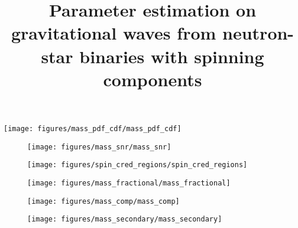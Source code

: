 \documentclass[iop,apj,twocolumn,twocolappendix,numberedappendix]{emulateapj}
\begin{document}
\title{Parameter estimation on gravitational waves from neutron-star binaries with spinning components}















\begin{figure*}
  \centering
  \texttt{[image: figures/mass\_pdf\_cdf/mass\_pdf\_cdf]}
  \caption{\protect} 
\end{figure*}

\begin{figure}
  \centering
  \texttt{[image: figures/mass\_snr/mass\_snr]}
  \caption{\protect} 
\end{figure}



\begin{figure}
  \centering
  \texttt{[image: figures/spin\_cred\_regions/spin\_cred\_regions]}
  \caption{\protect} 
\end{figure}



\begin{figure}
  \centering
  \texttt{[image: figures/mass\_fractional/mass\_fractional]}
  \caption{\protect} 
\end{figure}



\begin{figure}
  \centering
  \texttt{[image: figures/mass\_comp/mass\_comp]}
  \caption{\protect} 
\end{figure}



\begin{figure}
  \centering
  \texttt{[image: figures/mass\_secondary/mass\_secondary]}
  \caption{\protect} 
\end{figure}
\end{document}
